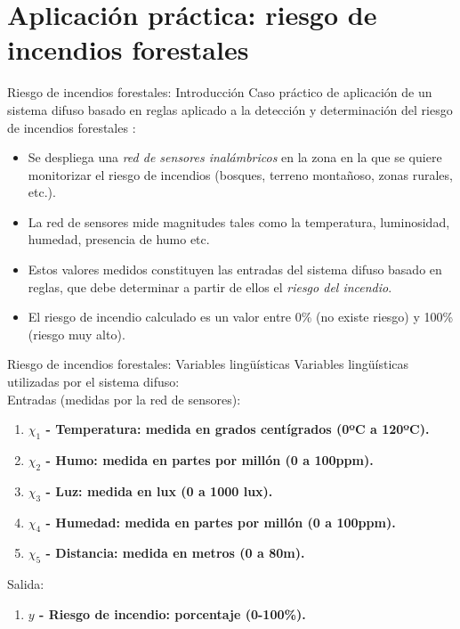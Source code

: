 \documentclass{beamer}
\begin{document}
\section{Aplicación práctica: riesgo de incendios forestales}
\begin{frame}{Riesgo de incendios forestales: Introducción}
Caso práctico de aplicación de un sistema difuso basado en reglas aplicado a la detección y determinación del riesgo de incendios forestales \cite{bolourchi2013}:
\begin{itemize}
	\item Se despliega una \emph{red de sensores inalámbricos} en la zona en la que se quiere monitorizar el riesgo de incendios (bosques, terreno montañoso, zonas rurales, etc.).
	\item La red de sensores mide magnitudes tales como la temperatura, luminosidad, humedad, presencia de humo etc.
	\item Estos valores medidos constituyen las entradas del sistema difuso basado en reglas, que debe determinar a partir de ellos el \emph{riesgo del incendio}.
	\item El riesgo de incendio calculado es un valor entre 0\% (no existe riesgo) y 100\% (riesgo muy alto).
\end{itemize}
\end{frame}

\begin{frame}{Riesgo de incendios forestales: Variables lingüísticas}
Variables lingüísticas utilizadas por el sistema difuso:
\\
\vspace{0.3cm}
	Entradas (medidas por la red de sensores):
	\begin{enumerate}
	   \item \bfseries $\chi_1$ - Temperatura: \normalfont medida en grados centígrados (0ºC a 120ºC).
	   \item \bfseries $\chi_2$ - Humo: \normalfont medida en partes por millón (0 a 100ppm).
	   \item \bfseries $\chi_3$ - Luz: \normalfont medida en lux (0 a 1000 lux).
	   \item \bfseries $\chi_4$ - Humedad: \normalfont medida en partes por millón (0 a 100ppm).
	   \item \bfseries $\chi_5$ - Distancia: \normalfont medida en metros (0 a 80m).
	\end{enumerate}
	\vspace{0.2cm}
	Salida:
	\begin{enumerate}
	   \item \bfseries $y$ - Riesgo de incendio: \normalfont porcentaje (0-100\%).
	\end{enumerate}
\end{frame}
\end{document}
